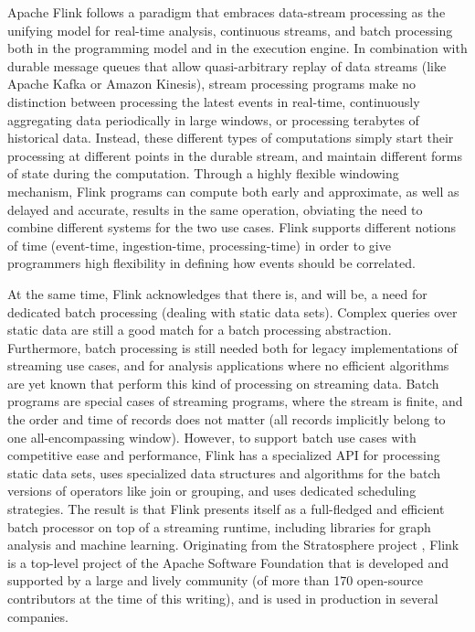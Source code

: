 \documentclass[11pt]{article}
\begin{document}
Apache Flink follows a paradigm that embraces data-stream processing as the unifying model for real-time analysis, continuous streams, and batch processing both in the programming model and in the execution engine. In combination with durable message queues that allow quasi-arbitrary replay of data streams (like Apache Kafka or Amazon Kinesis), stream processing programs make no distinction between processing the latest events in real-time, continuously aggregating data periodically in large windows, or processing terabytes of historical data. Instead, these different types of computations simply start their processing at different points in the durable stream, and maintain different forms of state during the computation. Through a highly flexible windowing mechanism, Flink programs can compute both early and approximate, as well as delayed and accurate, results in the same operation, obviating the need to combine different systems for the two use cases. Flink supports different notions of time (event-time, ingestion-time, processing-time) in order to give programmers high flexibility in defining how events should be correlated.
 
At the same time, Flink acknowledges that there is, and will be, a need for dedicated batch processing (dealing with static data sets). Complex queries over static data are still a good match for a batch processing abstraction. Furthermore, batch processing is still needed both for legacy implementations of streaming use cases, and for analysis applications where no efficient algorithms are yet known that perform this kind of processing on streaming data. Batch programs are special cases of streaming programs, where the stream is finite, and the order and time of records does not matter (all records implicitly belong to one all-encompassing window). However, to support batch use cases with competitive ease and performance, Flink has a specialized API for processing static data sets, uses specialized data structures and algorithms for the batch versions of operators like join or grouping, and uses dedicated scheduling strategies. The result is that Flink presents itself as a full-fledged and efficient batch processor on top of a streaming runtime, including libraries for graph analysis and machine learning. 
Originating from the Stratosphere project \cite{stratosphere}, Flink is a top-level project of the Apache Software Foundation that is developed and supported by a large and lively community (of more than 170 open-source contributors at the time of this writing), and is used in production in several companies.
\end{document}
